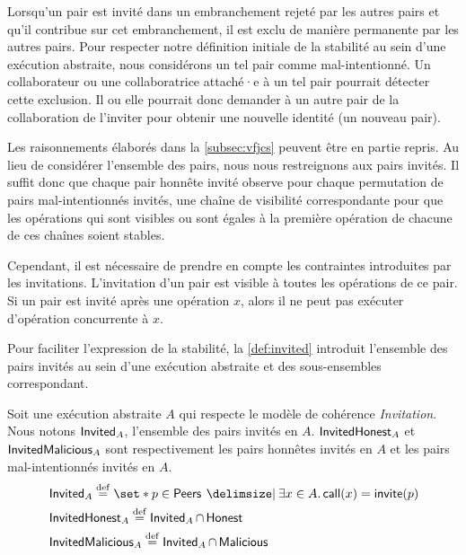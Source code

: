Lorsqu'un pair est invité dans un embranchement rejeté par les autres pairs et qu'il contribue sur cet embranchement, il est exclu de manière permanente par les autres pairs.
Pour respecter notre définition initiale de la stabilité au sein d'une exécution abstraite, nous considérons un tel pair comme mal-intentionné.
Un collaborateur ou une collaboratrice attaché·e à un tel pair pourrait détecter cette exclusion.
Il ou elle pourrait donc demander à un autre pair de la collaboration de l'inviter pour obtenir une nouvelle identité (un nouveau pair).

Les raisonnements élaborés dans la \autoref{subsec:vfjcs} peuvent être en partie repris.
Au lieu de considérer l'ensemble des pairs, nous nous restreignons aux pairs invités.
Il suffit donc que chaque pair honnête invité observe pour chaque permutation de pairs mal-intentionnés invités, une chaîne de visibilité correspondante pour que les opérations qui sont visibles ou sont égales à la première opération de chacune de ces chaînes soient stables.


Cependant, il est nécessaire de prendre en compte les contraintes introduites par les invitations.
L'invitation d'un pair est visible à toutes les opérations de ce pair.
Si un pair est invité après une opération $x$, alors il ne peut pas exécuter d'opération concurrente à $x$.

Pour faciliter l'expression de la stabilité, la \autoref{def:invited} introduit l'ensemble des pairs invités au sein d'une exécution abstraite et des sous-ensembles correspondant.

\begin{definition}[Invités]\label{def:invited}
Soit une exécution abstraite $A$ qui respecte le modèle de cohérence \emph{Invitation}.
Nous notons $\operatorname{\mathsf{Invited}}_A$, l'ensemble des pairs invités en $A$.
$\operatorname{\mathsf{InvitedHonest}}_A$ et $\operatorname{\mathsf{InvitedMalicious}}_A$ sont respectivement les pairs honnêtes invités en $A$ et les pairs mal-intentionnés invités en $A$.
\begin{align*}
&\trm{Invited}_A \defeq \set*{p \in \trm{Peers} \given \exists x \in A \qsep \trm{call}(x) = \trm{invite}(p)}\\
&\trm{InvitedHonest}_A \defeq \trm{Invited}_A \cap \trm{Honest}\\
&\trm{InvitedMalicious}_A \defeq \trm{Invited}_A \cap \trm{Malicious}
\end{align*}
\end{definition}


